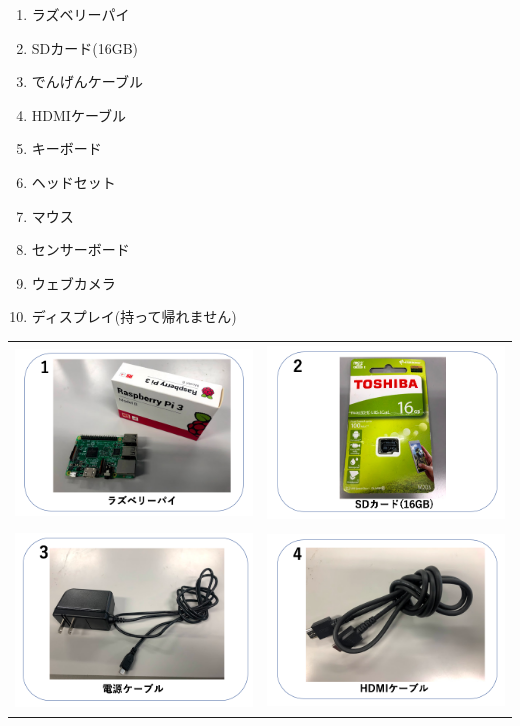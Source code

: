 \documentclass[a4paper,12pt]{jarticle}
\begin{document}
\bigskip

\begin{enumerate}
  \item ラズベリーパイ
  \item SDカード(16GB)
  \item でんげんケーブル
  \item HDMIケーブル
  \item キーボード
  \item ヘッドセット
  \item マウス
  \item センサーボード
  \item ウェブカメラ
  \item ディスプレイ(持って帰れません)
\end{enumerate}
\clearpage

\begin{tabular}{cc}
  \includegraphics[width=6.488cm,height=4.697cm]{textbook-img009.png}
   &
  \includegraphics[width=6.488cm,height=4.697cm]{textbook-img010.png} \\

  \includegraphics[width=6.488cm,height=4.697cm]{textbook-img007.png}
   &
  \includegraphics[width=6.488cm,height=4.697cm]{textbook-img008.png} \\


\end{tabular}
\end{document}
